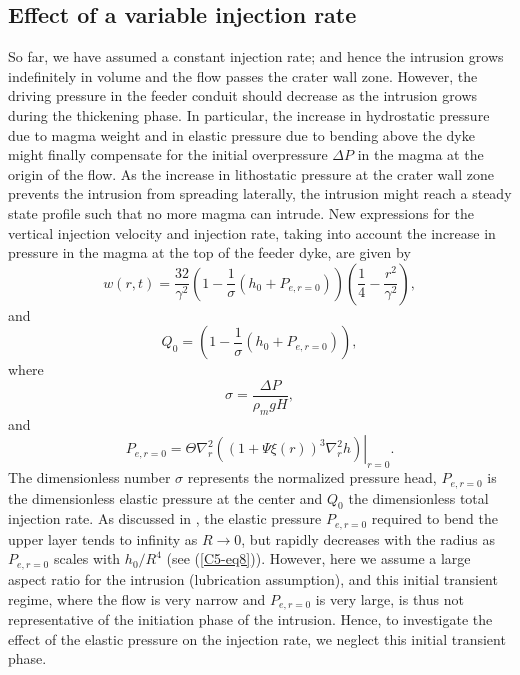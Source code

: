 \subsection{Effect of a variable injection rate}
\label{C5-Injection_Rate_Effect}
	 
So  far, we  have assumed  a constant  injection rate;  and hence  the
intrusion grows indefinitely in volume  and the flow passes the crater
wall zone.  However, the driving pressure in the feeder conduit should
decrease  as the  intrusion  grows during  the  thickening phase.   In
particular, the increase  in hydrostatic pressure due  to magma weight
and in  elastic pressure due to  bending above the dyke  might finally
compensate for the initial overpressure $\Delta P$ in the magma at the
origin of  the flow.  As the  increase in lithostatic pressure  at the
crater wall zone prevents the  intrusion from spreading laterally, the
intrusion might reach  a steady state profile such that  no more magma
can intrude. New  expressions for the vertical  injection velocity and
injection rate,  taking into account  the increase in pressure  in the
magma at the top of the feeder dyke, are given by
\begin{equation}
  w(r,t)=\frac{32}{\gamma^{2}} \left(1-\frac{1}{\sigma}\left(h_0+P_{e,r=0} \right)\right)
  \left(\frac{1}{4}-\frac{r^{2}}{\gamma^{2}}\right),
  \label{C5-5.3}
\end{equation}
and
\begin{equation}
  Q_{0}=\left(1-\frac{1}{\sigma}\left(h_0+ P_{e,r=0}\right)\right),
  \label{C5-eq5.4}
\end{equation}
where
\begin{equation}
  \sigma=\frac{\Delta P}{\rho_{m}gH},
  \label{C5-eq5.4.5}
\end{equation}
and
\begin{equation}
  P_{e,r=0}= \Theta \nabla^{2}_{r}\left.\left ((1+\Psi \xi(r))^{3}\nabla^{2}_{r}h \right )\right|_{r=0}.
\end{equation}
The dimensionless  number $\sigma$ represents the  normalized pressure
head, $P_{e,r=0}$ is the dimensionless  elastic pressure at the center
and $Q_{0}$ the  dimensionless total injection rate.   As discussed in
\citet{Michaut:2011kg}, the  elastic pressure $P_{e,r=0}$  required to
bend  the upper  layer  tends  to infinity  as  $R\rightarrow 0$,  but
rapidly decreases with the radius as $P_{e,r=0}$ scales with $h_0/R^4$
(see (\ref{C5-eq8})). However, here we assume a large aspect ratio for
the  intrusion (lubrication  assumption), and  this initial  transient
regime, where the  flow is very narrow and $P_{e,r=0}$  is very large,
is  thus   not  representative   of  the   initiation  phase   of  the
intrusion. Hence, to investigate the effect of the elastic pressure on
the injection rate, we neglect this initial transient phase.


